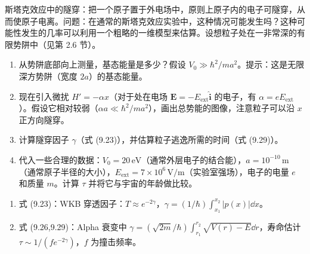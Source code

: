 \begin{question}
斯塔克效应中的隧穿：把一个原子置于外电场中，原则上原子内的电子可隧穿，从而使原子电离。问题：在通常的斯塔克效应实验中，这种情况可能发生吗？这种可能性发生的几率可以利用一个粗略的一维模型来估算。设想粒子处在一非常深的有限势阱中（见第 2.6 节）。
\begin{enumerate}
\item 从势阱底部向上测量，基态能量是多少？假设 $V_0\gg\hbar^2/ma^2$。提示：这是无限深方势阱（宽度 $2a$）的基态能量。
\item 现在引入微扰 $H'=-\alpha x$（对于处在电场 $\mathbf E=-E_{\mathrm{ext}}\hat{\mathbf i}$ 的电子，有 $\alpha=eE_{\mathrm{ext}}$）。假设它相对较弱（$\alpha a\ll\hbar^2/ma^2$），画出总势能的图像，注意粒子可以沿 $x$ 正方向隧穿。
\item 计算隧穿因子 $\gamma$（式 (9.23)），并估算粒子逃逸所需的时间（式 (9.29)）。
\item 代入一些合理的数据：$V_0=20\,\mathrm{eV}$（通常外层电子的结合能），$a=10^{-10}\,\mathrm{m}$（通常原子半径的大小），$E_{\mathrm{ext}}=7\times10^6\,\mathrm{V/m}$（实验室强场），电子的电量 $e$ 和质量 $m$。计算 $\tau$ 并将它与宇宙的年龄做比较。
\end{enumerate}

\par\smallskip
{}
\begin{enumerate}[leftmargin=2.2em,itemsep=0.12em,topsep=0.12em,parsep=0pt]
\item 式 (9.23)：WKB 穿透因子：$T\approx e^{-2\gamma}$，$\gamma=(1/\hbar)\int_{x_1}^{x_2}|p(x)|\dd x$。
\item 式 (9.26,9.29)：Alpha 衰变中 $\gamma=(\sqrt{2m}/\hbar)\int_{r_1}^{r_2}\sqrt{V(r)-E}\dd r$，寿命估计 $\tau\sim 1/(f e^{-2\gamma})$，$f$ 为撞击频率。
\end{enumerate}

\end{question}
